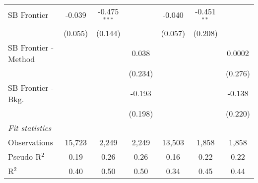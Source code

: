 \begin{tabular}{lcccccc}
   SB Frontier          & -0.039  & -0.475$^{***}$ &         & -0.040       & -0.451$^{**}$ &   \\   
                        & (0.055) & (0.144)        &         & (0.057)      & (0.208)       &   \\   
   SB Frontier - Method &         &                & 0.038   &              &               & 0.0002\\   
                        &         &                & (0.234) &              &               & (0.276)\\   
   SB Frontier - Bkg.   &         &                & -0.193  &              &               & -0.138\\   
                        &         &                & (0.198) &              &               & (0.220)\\   
   \midrule
   \emph{Fit statistics}\\
   Observations         & 15,723  & 2,249          & 2,249   & 13,503       & 1,858         & 1,858\\  
   Pseudo R$^2$         & 0.19    & 0.26           & 0.26    & 0.16         & 0.22          & 0.22\\  
   R$^2$                & 0.40    & 0.50           & 0.50    & 0.34         & 0.45          & 0.44\\  
   

\end{tabular}
